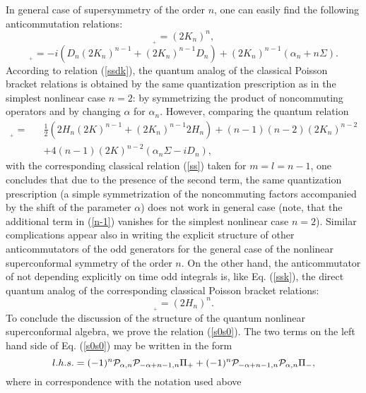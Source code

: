 \documentclass[a4paper,12pt]{article}
\begin{document}
In general case of supersymmetry of the order $n$,
one can easily find the following anticommutation relations:
\begin{equation}
[S^+_{n,n},S^-_{n,n}]_{{}_+}=(2K_n)^n,
\label{ssk}
\end{equation}
\begin{equation}
[S^+_{n,n},S^-_{n,n-1}]_{{}_+}=-i
(D_n (2K_n)^{n-1}+(2K_n)^{n-1}D_n)+(2K_n)^{n-1}(\alpha_n+n
\Sigma).
\label{ssdk}
\end{equation}
According to relation (\ref{ssdk}),
the quantum analog of the
classical Poisson bracket relations
is obtained by the same quantization prescription as in
the simplest nonlinear case $n=2$: by symmetrizing the
product of noncommuting operators and by changing $\alpha$
for
$\alpha_n$.
However, comparing the quantum relation
\begin{eqnarray}
[S^+_{n,n-1},S^-_{n,n-1}]_{{}_+}=&&\frac{1}{2}
(2H_n(2K)^{n-1}+(2K_n)^{n-1}2H_n)+(n-1)(n-2)(2K_n)^{n-2}
\nonumber\\
&&+4(n-1)(2K)^{n-2}(\alpha_n\Sigma-iD_n),
\label{n-1}
\end{eqnarray}
with the corresponding classical relation
(\ref{ss}) taken for $m=l=n-1$,
one concludes that due to the presence of the
second term,
the same quantization
prescription (a simple symmetrization of  the
noncommuting factors accompanied by the
shift of the parameter $\alpha$)
does not work in general case
(note, that the additional term in (\ref{n-1})
vanishes
for the simplest nonlinear case $n=2$).
Similar complications appear also
in writing the explicit structure of other anticommutators
of the odd generators for the general case
of the nonlinear superconformal symmetry
of the order $n$.
On the other hand, the anticommutator of not depending
explicitly on time
odd integrals  is, like Eq. (\ref{ssk}), the direct quantum
analog of the
corresponding
classical Poisson bracket relations:
\begin{equation}
[S^+_{n,0},S^-_{n,0}]_{{}_+}=(2H_n)^n.
\label{s0s0}
\end{equation}
To conclude the discussion of the structure
of the quantum nonlinear superconformal algebra,
we prove the relation (\ref{s0s0}).
The two terms on the left hand side of Eq.
(\ref{s0s0}) may be written in the form
\begin{equation}
l.h.s.= (-1)^n{\cal P}_{\alpha,n}{\cal P}_{-\alpha +n-1,n}
\Pi_+
+(-1)^n{\cal P}_{-\alpha+n-1,n}{\cal P}_{\alpha,n}\Pi_-,
\label{lhs}
\end{equation}
where in correspondence with the notation used above
\end{document}
